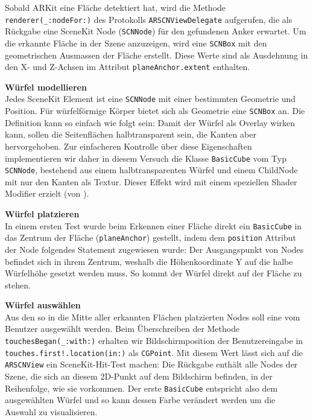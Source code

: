 \begin{description}
	Sobald ARKit eine Fläche detektiert hat, wird die Methode \texttt{renderer(\_:nodeFor:)} des Protokolls \texttt{ARSCNViewDelegate} aufgerufen, die als Rückgabe eine SceneKit Node (\texttt{SCNNode}) für den gefundenen Anker erwartet. Um die erkannte Fläche in der Szene anzuzeigen, wird eine \texttt{SCNBox} mit den geometrischen Ausmassen der Fläche erstellt. Diese Werte sind als Ausdehnung in den X- und Z-Achsen im Attribut \texttt{planeAnchor.extent} enthalten.

	\textbf{Würfel modellieren}\\
	Jedes SceneKit Element ist eine \texttt{SCNNode} mit einer bestimmten Geometrie und Position. Für würfelförmige Körper bietet sich als Geometrie eine \texttt{SCNBox} an. Die Definition kann so einfach wie folgt sein:
	Damit der Würfel als Overlay wirken kann, sollen die Seitenflächen halbtransparent sein, die Kanten aber hervorgehoben. Zur einfacheren Kontrolle über diese Eigenschaften implementieren wir daher in diesem Versuch die Klasse \texttt{BasicCube} vom Typ \texttt{SCNNode}, bestehend aus einem halbtransparenten Würfel und einem ChildNode mit nur den Kanten als Textur. Dieser Effekt wird mit einem speziellen Shader Modifier erzielt (von \cite{so-shader-modifier}).

	\textbf{Würfel platzieren}\\
	In einem ersten Test wurde beim Erkennen einer Fläche direkt ein \texttt{BasicCube} in das Zentrum der Fläche (\texttt{planeAnchor}) gestellt, indem dem \texttt{position} Attribut der Node folgendes Statement zugewiesen wurde:
	Der Ausgangspunkt von Nodes befindet sich in ihrem Zentrum, weshalb die Höhenkoordinate Y auf die halbe Würfelhöhe gesetzt werden muss. So kommt der Würfel direkt auf der Fläche zu stehen.

	\textbf{Würfel auswählen}\\
	Aus den so in die Mitte aller erkannten Flächen platzierten Nodes soll eine vom Benutzer ausgewählt werden. Beim Überschreiben der Methode \texttt{touchesBegan(\_:with:)} erhalten wir Bildschirmposition der Benutzereingabe in \texttt{touches.first!.location(in:)} als \texttt{CGPoint}. Mit diesem Wert lässt sich auf die \texttt{ARSCNView} ein SceneKit-Hit-Test machen:
	Die Rückgabe enthält alle Nodes der Szene, die sich an diesem 2D-Punkt auf dem Bildschirm befinden, in der Reihenfolge, wie sie vorkommen. Der erste \texttt{BasicCube} entspricht also dem ausgewählten Würfel und so kann dessen Farbe verändert werden um die Auswahl zu visualisieren.


\end{description}
